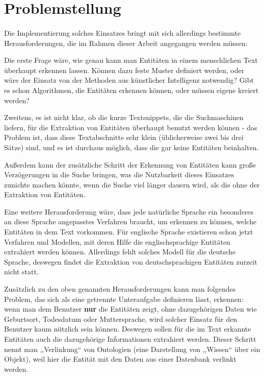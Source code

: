 \section{Problemstellung}
\label{sec:Problemstellung}
\paragraph{}
Die Implementierung solches Einsatzes bringt mit sich allerdings bestimmte Herausforderungen, die im Rahmen dieser Arbeit angegangen werden müssen:

Die erste Frage wäre, wie genau kann man Entitäten in einem menschlichen Text überhaupt erkennen lassen. Können dazu feste Muster definiert werden, oder wäre der Einsatz von der Methoden aus künstlicher Intelligenz notwendig? Gibt es schon Algorithmen, die Entitäten erkennen können, oder müssen eigene kreiert werden? 

Zweitens, es ist nicht klar, ob die kurze Textsnippets, die die Suchmaschinen liefern, für die Extraktion von Entitäten überhaupt benutzt werden können - das Problem ist, dass diese Textabschnitte sehr klein (üblicherweise zwei bis drei Sätze) sind, und es ist durchaus möglich, dass die gar keine Entitäten beinhalten.

Außerdem kann der zusätzliche Schritt der Erkennung von Entitäten kann große Verzögerungen in die Suche bringen, was die Nutzbarkeit dieses Einsatzes zunichte machen könnte, wenn die Suche viel länger dauern wird, als die ohne der Extraktion von Entitäten.

Eine weitere Herausforderung wäre, dass jede natürliche Sprache ein besonderes an diese Sprache angepasstes Verfahren braucht, um erkennen zu können, welche Entitäten in dem Text vorkommen. Für englische Sprache existieren schon jetzt Verfahren und Modellen, mit deren Hilfe die englischsprachige Entitäten extrahiert werden können. Allerdings fehlt solches Modell für die deutsche Sprache, deswegen findet die Extraktion von deutschsprachigen Entitäten zurzeit nicht statt.

Zusätzlich zu den oben genannten Herausforderungen kann man folgendes Problem, das sich als eine getrennte Unteraufgabe definieren lässt, erkennen: wenn man dem Benutzer \textbf{nur} die Entitäten zeigt, ohne dazugehörigen Daten wie Geburtsort, Todesdatum oder Muttersprache, wird solcher Einsatz für den Benutzer kaum nützlich sein können. Deswegen sollen für die im Text erkannte Entitäten auch die dazugehörige Informationen extrahiert werden. Dieser Schritt nennt man ,,Verlinkung`` von Ontologien (eine Darstellung von ,,Wissen`` über ein Objekt), weil hier die Entität mit den Daten aus einer Datenbank verlinkt werden.

